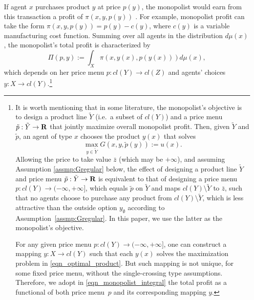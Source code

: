 If agent $x$ purchases product $y$ at price $p(y)$, the monopolist would earn from this transaction a profit of $\pi(x,y,p(y))$%
.  {For example, monopolist profit can take the form $\pi(x,y,p(y)) = p(y)-c(y)$, where %
$c(y)$ is a variable manufacturing cost function.} Summing over all agents in the distribution $d\mu(x)$, the monopolist's total profit is characterized by 
\begin{equation}\label{eqn_monopolist_integral}
	\Pi(p, y):=\int_{X} \pi(x, y(x), p(y(x))) d\mu(x),
\end{equation}
which depends on her price menu $p: cl(Y) \rightarrow cl(Z)$ and  agents' choices $y: X \rightarrow cl(Y)$.\footnote{It is worth mentioning that in some literature, the monopolist's objective is to design a product line $\tilde{Y}$ (i.e.~a subset of $cl(Y)$) and a price menu $\tilde{p}: \tilde{Y} \rightarrow {\mathbf R}$ that jointly maximize overall monopolist profit. Then, given $\tilde{Y}$ and $\tilde{p}$, an agent of type $x$ chooses the product $y(x)$ that solves
	\begin{equation*}
		\max_{y \in \tilde{Y}} G(x,y, \tilde{p}(y)):= u(x).
	\end{equation*}
Allowing the price to take value $\bar{z}$ (which may be $+\infty$), and assuming Assumption \ref{assmp:Gregular} below, the effect of designing a product line $\tilde{Y}$ and price menu $\tilde{p}: \tilde{Y}\rightarrow {\mathbf R}$ is equivalent to that of designing a price menu $p : cl(Y)\rightarrow (-\infty, +\infty]$, which equals $\tilde{p}$ on $\tilde{Y}$ and maps $cl(Y) \setminus \tilde{Y}$ to $\bar{z}$, such that no agents choose to purchase any product from $cl(Y) \setminus \tilde{Y}$, which is less attractive than the outside option $y_{\emptyset}$ according to Assumption~\ref{assmp:Gregular}. In this paper, we use the latter as the monopolist's objective.
 \vspace{0.1cm}
 
For any given price menu $p: cl(Y)\rightarrow (-\infty, +\infty]$, one can construct a mapping $y: X \rightarrow cl(Y)$ such that each $y(x)$ solves the maximization problem in \eqref{eqn_optimal_product}. But such mapping is not unique, for some fixed price menu, without the single-crossing type assumptions. %
Therefore, we adopt in \eqref{eqn_monopolist_integral} the total profit as a functional of both price menu~$p$ and its corresponding mapping $y$.}\medskip

